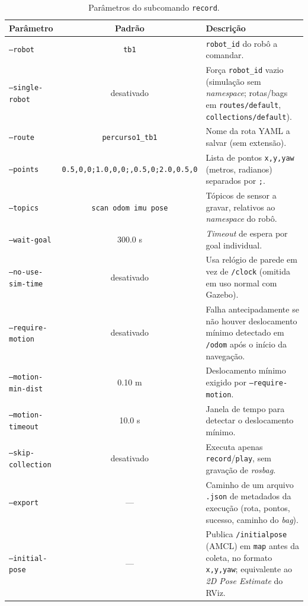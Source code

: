 \begin{table}[H]
\centering
\caption{Parâmetros do subcomando \texttt{record}.}
\begin{tabularx}{\textwidth}{lcX}
\toprule
\textbf{Parâmetro} & \textbf{Padrão} & \textbf{Descrição} \\
\midrule
\texttt{--robot} & \texttt{tb1} & \texttt{robot\_\allowbreak id} do robô a comandar. \\
\texttt{--single-robot} & desativado & Força \texttt{robot\_\allowbreak id} vazio (simulação sem \textit{namespace}; rotas/bags em \texttt{routes/\allowbreak default}, \texttt{collections/\allowbreak default}). \\
\texttt{--route} & \texttt{percurso1\_\allowbreak tb1} & Nome da rota YAML a salvar (sem extensão). \\
\texttt{--points} & \texttt{0.5,0,0;1.0,0,0;\allowbreak 1.5,0.5,0;2.0,0.5,0} & Lista de pontos \texttt{x,y,yaw} (metros, radianos) separados por \texttt{;}. \\
\texttt{--topics} & \texttt{scan odom imu pose} & Tópicos de sensor a gravar, relativos ao \textit{namespace} do robô. \\
\texttt{--wait-goal} & 300.0 s & \textit{Timeout} de espera por goal individual. \\
\texttt{--no-use-sim-time} & desativado & Usa relógio de parede em vez de \texttt{/\allowbreak clock} (omitida em uso normal com Gazebo). \\
\texttt{--require-motion} & desativado & Falha antecipadamente se não houver deslocamento mínimo detectado em \texttt{/\allowbreak odom} após o início da navegação. \\
\texttt{--motion-min-dist} & 0.10 m & Deslocamento mínimo exigido por \texttt{--require-motion}. \\
\texttt{--motion-timeout} & 10.0 s & Janela de tempo para detectar o deslocamento mínimo. \\
\texttt{--skip-collection} & desativado & Executa apenas \texttt{record}/\texttt{play}, sem gravação de \textit{rosbag}. \\
\texttt{--export} & --- & Caminho de um arquivo \texttt{.json} de metadados da execução (rota, pontos, sucesso, caminho do \textit{bag}). \\
\texttt{--initial-pose} & --- & Publica \texttt{/\allowbreak initialpose} (AMCL) em \texttt{map} antes da coleta, no formato \texttt{x,y,yaw}; equivalente ao \textit{2D Pose Estimate} do RViz. \\
\bottomrule
\end{tabularx}
\end{table}

